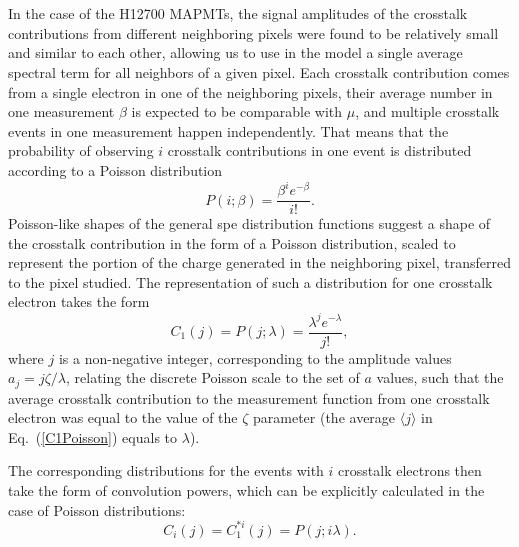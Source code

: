 \newpage
\newpage
\appendix
\section{}
\label{AppendixA}

In the case of the H12700 MAPMTs, the signal amplitudes of the crosstalk contributions from different neighboring pixels were found to be relatively small and similar to each other, allowing us to use in the model a single average spectral term for all neighbors of a given pixel. Each crosstalk contribution comes from a single electron in one of the neighboring pixels, their average number in one measurement $\beta$ is expected to be comparable with $\mu$, and multiple crosstalk events in one measurement happen independently. That means that the probability of observing $i$ crosstalk contributions in one event is distributed according to a Poisson distribution
\begin{equation}
\label{CTPoisson}
 P(i;\beta) = \frac{\beta^{i} e^{-\beta}}{i!}.
\end{equation}
Poisson-like shapes of the general spe distribution functions suggest a shape of the crosstalk contribution in the form of a Poisson distribution, scaled to represent the portion of the charge generated in the neighboring pixel, transferred to the pixel studied. The representation of such a distribution for one crosstalk electron takes the form
\begin{equation}
\label{C1Poisson}
 C_1(j) = P(j;\lambda) = \frac{\lambda^{j} e^{-\lambda}}{j!},
\end{equation}
where $j$ is a non-negative integer, corresponding to the amplitude values $a_j = j \zeta / \lambda $, relating the discrete Poisson scale to the set of $a$ values, such that the average crosstalk contribution to the measurement function from one crosstalk electron was equal to the value of the $\zeta$ parameter (the average $\langle j \rangle$ in Eq.~(\ref{C1Poisson}) equals to $\lambda$).

The corresponding distributions for the events with $i$ crosstalk electrons then take the form of convolution powers, which can be explicitly calculated in the case of Poisson distributions: 
\begin{equation}
\label{CiPoisson}
 C_i(j) = C_1^{*i}(j) = P(j;i\lambda).
\end{equation}

